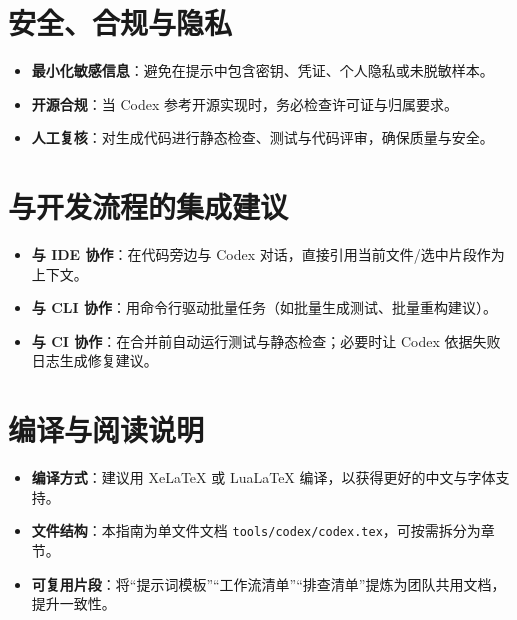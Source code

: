 \documentclass[UTF8,zihao=-4]{ctexart}
\begin{document}
\section{安全、合规与隐私}
\begin{itemize}
  \item \textbf{最小化敏感信息}：避免在提示中包含密钥、凭证、个人隐私或未脱敏样本。
  \item \textbf{开源合规}：当 Codex 参考开源实现时，务必检查许可证与归属要求。
  \item \textbf{人工复核}：对生成代码进行静态检查、测试与代码评审，确保质量与安全。
\end{itemize}

\section{与开发流程的集成建议}
\begin{itemize}
  \item \textbf{与 IDE 协作}：在代码旁边与 Codex 对话，直接引用当前文件/选中片段作为上下文。
  \item \textbf{与 CLI 协作}：用命令行驱动批量任务（如批量生成测试、批量重构建议）。
  \item \textbf{与 CI 协作}：在合并前自动运行测试与静态检查；必要时让 Codex 依据失败日志生成修复建议。
\end{itemize}

\section{编译与阅读说明}
\begin{itemize}
  \item \textbf{编译方式}：建议用 XeLaTeX 或 LuaLaTeX 编译，以获得更好的中文与字体支持。
  \item \textbf{文件结构}：本指南为单文件文档 \texttt{tools/codex/codex.tex}，可按需拆分为章节。
  \item \textbf{可复用片段}：将“提示词模板”“工作流清单”“排查清单”提炼为团队共用文档，提升一致性。
\end{itemize}
\end{document}
